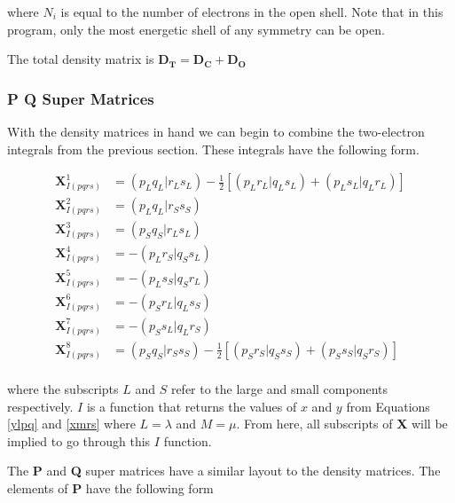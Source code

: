 \documentclass[12pt]{report}
\begin{document}
where $N_{i}$ is equal to the number of electrons in the open shell. Note that in this program, only the most energetic shell of any symmetry can be open.

The total density matrix is $\textbf{D$_{\textbf{T}}$} =  \textbf{D$_{\textbf{C}}$} + \textbf{D$_{\textbf{O}}$}$

\subsubsection{P Q Super Matrices}
With the density matrices in hand we can begin to combine the two-electron integrals from the previous section. These integrals have the following form.

\begin{equation}
\label{2EINTS}
\begin{split}
\textbf{X}^{1}_{I(pqrs)}	&	= \left(p_{L}q_{L}|r_{L}s_{L}\right) - \frac{1}{2}\left[\left(p_{L}r_{L}|q_{L}s_{L}\right) + \left(p_{L}s_{L}|q_{L}r_{L}\right)\right]	\\
\textbf{X}^{2}_{I(pqrs)}	&	= \left(p_{L}q_{L}|r_{S}s_{S}\right)																	\\
\textbf{X}^{3}_{I(pqrs)}	&	= \left(p_{S}q_{S}|r_{L}s_{L}\right)																	\\
\textbf{X}^{4}_{I(pqrs)}	&	= -\left(p_{L}r_{S}|q_{S}s_{L}\right)																	\\
\textbf{X}^{5}_{I(pqrs)}	&	= -\left(p_{L}s_{S}|q_{S}r_{L}\right)																	\\
\textbf{X}^{6}_{I(pqrs)}	&	= -\left(p_{S}r_{L}|q_{L}s_{S}\right)																	\\
\textbf{X}^{7}_{I(pqrs)}	&	= -\left(p_{S}s_{L}|q_{L}r_{S}\right)																	\\
\textbf{X}^{8}_{I(pqrs)}	&	= \left(p_{S}q_{S}|r_{S}s_{S}\right) - \frac{1}{2}\left[\left(p_{S}r_{S}|q_{S}s_{S}\right) + \left(p_{S}s_{S}|q_{S}r_{S}\right)\right]	\\
\end{split}
\end{equation}

where the subscripts $L$ and $S$ refer to the large and small components respectively. $I$ is a function that returns the values of $x$ and $y$ from Equations \ref{ylpq} and \ref{xmrs} where $L=\lambda$ and $M=\mu$. From here, all subscripts of \textbf{X} will be implied to go through this $I$ function.

The \textbf{P} and \textbf{Q} super matrices have a similar layout to the density matrices. The elements of \textbf{P} have the following form
\end{document}
